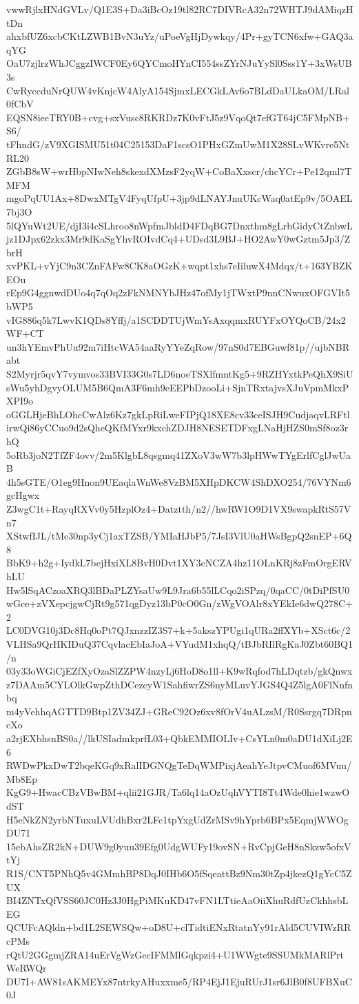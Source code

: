 vwwRjlxHNdGVLv/Q1E3S+Da3iBcOz19tl82RC7DIVRcA32n72WHTJ9dAMiqzHtDn
ahxbfUZ6xcbCKtLZWB1BvN3uYz/uPoeVgHjDywkqy/4Pr+gyTCN6xfw+GAQ3aqYG
OaU7zjlrzWhJCggzIWCF0Ey6QYCmoHYnCI554ssZYrNJuYySl0Sss1Y+3xWsUB3s
CwRyccduNrQUW4vKnjcW4AlyA154SjmxLECGkLAv6o7BLdDaULkaOM/LRal0fCbV
EQSN8ieeTRY0B+cvg+sxVusc8RKRDz7K0vFtJ5z9VqoQt7efGT64jC5FMpNB+S6/
tFhndG/zV9XGISMU51t04C25153DaF1scsO1PHxGZmUwM1X28SLvWKvre5NtRL20
ZGbB8sW+wrHbpNIwNeh8skexdXMzsF2yqW+CoBaXxscr/chcYCr+Pe12qml7TMFM
mgoPqUU1Ax+8DwxMTgV4FyqUfpU+3jp9dLNAYJnuUKcWaq0atEp9v/5OAEL7bj3O
5lQYuWt2UE/djI3i4cSLhroo8nWpfmJbldD4FDqBG7Dnxthm8gLrbGidyCtZnbwL
jz1DJpx62zkx3Mr9dKaSgYhvROIvdCq4+UDsd3L9BJ+HO2AwY0wGztm5Jp3/ZbrH
xvPKL+vYjC9n3CZnFAFw8CK8aOGzK+wqpt1xhs7eIiluwX4Mdqx/t+163YBZKEOu
rEp9G4ggnwdDUo4q7qOq2zFkNMNYbJHz47ofMy1jTWxtP9nnCNwuxOFGVIt5bWP5
vIG886q5k7LwvK1QDs8Yffj/a1SCDDTUjWmYsAxqqmxRUYFxOYQoCB/24x2WF+CT
un3hYEmvPhUu92m7iHtcWA54aaRyYYeZqRow/97nS0d7EBGuwf81p//ujbNBRabt
S2Myrjr5qvY7vymvos33BVI33G0s7LD6noeTSXlfmntKg5+9RZHYxtkPeQhX9SiU
sWu5yhDgvyOLUM5B6QmA3F6mh9eEEPbDzooLi+SjnTRxtajvsXJuVpmMkxPXPI9o
oGGLHjeBhLOhcCwAlz6Kz7gkLpRiLweFIPjQ18XE8cv33ceISJH9CudjaqvLRFtl
irwQi86yCCuo9d2sQheQKfMYxr9kxchZDJH8NESETDFxgLNaHjHZS0mSf8oz3rhQ
5oRb3joN2TfZF4ovv/2m5KlgbL8qsgmq41ZXoV3wW7b3lpHWwTYgErlfCglJwUaB
4h5sGTE/O1eg9Hnon9UEaqlaWnWe8VzBM5XHpDKCW4ShDXO254/76VYNm6gcHgwx
Z3wgC1t+RayqRXVv0y5HzplOz4+Datztth/n2//hwRW1O9D1VX9swapkRtS57Vn7
XStwfIJL/tMe30np3yCj1axTZSB/YMIaHJbP5/7JsI3VlU0aHWsBgpQ2snEP+6Q8
BbK9+h2g+IydkL7bejHxiXL8BvH0Dvt1XY3cNCZA4hz11OLnKRj8zFmOrgERVhLU
Hw5lSqACzoaXRQ3lBDaPLZYsaUw9L9Jra6b55lLCqo2iSPzq/0qaCC/0tDiPfSU0
wGce+zVXepcjgwCjRt9g571qgDyz13bP0cO0Gn/zWgVOAlr8xYEkIe6dwQ278C+2
LC0DVG10j3Dc8Hq0oPt7QJxnzzIZ3S7+k+5akszYPUgi1qURa2ffXYb+XSct6c/2
VLHSa9QrHKIDuQ37CqvlacEbIaJoA+VYudM1xhqQ/tBJbRIlRgKaJ0Zbt60BQ1/n
03y33oWGiCjEZfXyOzaSlZZPW4nzyLj6HoD8o1ll+K9wRqfod7hLDqtzb/gkQnwx
z7DAAm5CYLOlkGwpZthDCezcyW1SahfiwrZS6nyMLuvYJGS4Q4Z5lgA0FlNnfnbq
m4yVehhqAGTTD9Btp1ZV34ZJ+GReC92Oz6xv8fOrV4uALzsM/R0Ssrgq7DRpncXo
a2rjEXbhsnBS0a//lkUSIadmkprfL03+QbkEMMIOLIv+CsYLn0m0aDU1dXiLj2E6
RWDwPkxDwT2bqeKGq9xRalIDGNQgTeDqWMPixjAeahYeJtpvCMuof6MVuu/Mb8Ep
KgG9+HwacCBzVBwBM+qlii21GJR/Ta6lq14aOzUqhVYTI8Tt4Wde0hie1wzwOdST
H5eNkZN2yrbNTuxuLVUdhBxr2LFc1tpYxgUdZrMSv9hYprb6BPx5EqmjWWOgDU71
15ebAhsZR2kN+DUW9g0yuu39Efg0UdgWUFy19ovSN+RvCpjGeH8nSkzw5ofxVtYj
R1S/CNT5PNhQ5v4GMmhBP8DqJ0IHb6O5fSqeattBz9Nm30tZp4jkezQ1gYcC5ZUX
BI4ZNTxQfVSS60JC0Hz3J0HgPiMKuKD47vFN1LTtieAaOiiXhuRdfUzCkhhsbLEG
QCUFcAQldn+bd1L2SEWSQw+oD8U+clTidtiENxRtatnYy91rAld5CUVIWzRRcPMs
rQtU2GGgmjZRA14uErVgWzGecIFMMlGqkpzi4+U1WWgte9SSUMkMARlPrtWeRWQr
DU7I+AW81sAKMEYx87ntrkyAHuxxme5/RP4EjJ1EjuRUrJ1sr6JlB0f8UFBXuC0J

